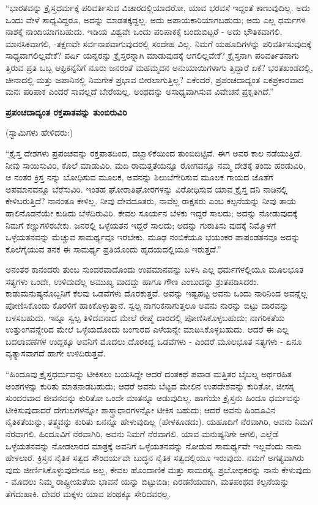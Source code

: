 “ಭಾರತವನ್ನು ಕ್ರೈಸ್ತಧರ್ಮಕ್ಕೆ ಪರಿವರ್ತಿಸುವ ವಿಚಾರದಲ್ಲಿಯಾದರೋ, ಯಾವ ಭರವಸೆ ಇದ್ದಂತೆ ಕಾಣುವುದಿಲ್ಲ. ಅದು ಒಂದು ವೇಳೆ ಸಾಧ್ಯವಿದ್ದರೂ, ಅದನ್ನು ಮಾಡತಕ್ಕದ್ದಲ್ಲ. ಅದು ಅಪಾಯಕಾರಿಯಾಗಬಹುದು; ಅದು ಎಲ್ಲ ಧರ್ಮಗಳ ನಾಶಕ್ಕೆ ನಾಂದಿಯಾಗಬಹುದು. ಇಡಿಯ ವಿಶ್ವವೇ ಒಂದು ಪರಿಪಾಕಕ್ಕೆ ಬಂದುಬಿಟ್ಟರೆ - ಅದು ಭೌತಿಕವಾಗಲಿ, ಮಾನಸಿಕವಾಗಲಿ, -ತಕ್ಷಣವೇ ಸರ್ವನಾಶವಾಗುವುದರಲ್ಲಿ ಸಂದೇಹ ವಿಲ್ಲ. ನಿಮಗೆ ಯಹೂದಿಗಳನ್ನು ಪರಿವರ್ತಿಸುವುದಕ್ಕೆ ಸಾಧ್ಯವಾಗಲಿಲ್ಲವೇಕೆ? ಪರ್ಷಿ ಯನ್ನರನ್ನು ಕ್ರೈಸ್ತರನ್ನಾಗಿ ಮಾಡುವುದಕ್ಕೆ ಆಗಲಿಲ್ಲವೇಕೆ? ಕ್ರೈಸ್ತನಾಗಿ ಪರಿವರ್ತಿತನಾಗು ತ್ತಿರುವ ಪ್ರತಿ ಒಬ್ಬ ಆಫ್ರಿಕನ್ನನಿಗೆ ನೂರು ಜನರಂತೆ ಮಹಮ್ಮದನ ಅನುಯಾಯಿಗಳಾಗು ತ್ತಿದ್ದಾರೆ ಏಕೆ? ಭರತಖಂಡದಲ್ಲಿ, ಚೀನಾದಲ್ಲಿ ಮತ್ತು ಜಪಾನಿನಲ್ಲಿ ನಿಮಗೇಕೆ ಪ್ರಭಾವ ಬೀರಲಾಗುತ್ತಿಲ್ಲ? ಏಕೆಂದರೆ, ಪ್ರಪಂಚದಾದ್ಯಂತ ಏಕಪ್ರಕಾರವಾದ ಮನಃ ಪರಿಪಾಕ ಎಂದರೆ ಸಾವಲ್ಲದೆ ಬೇರೆಯಲ್ಲ. ಅಂಥದನ್ನು ಅಸಾಧ್ಯವಾಗಿಸುವ ವಿವೇಚನೆ ಪ್ರಕೃತಿಗಿದೆ.”

\begin{center}
\textbf{ಪ್ರಪಂಚದಾದ್ಯಂತ ರಕ್ತಪಾತವನ್ನು ತುಂಬಿರುವಿರಿ}
\end{center}

(ಸ್ವಾಮಿಗಳು ಹೇಳಿದರು:)

“ಕ್ರೈಸ್ತ ದೇಶಗಳು ಪ್ರಪಂಚವನ್ನು ರಕ್ತಪಾತದಿಂದ, ದಬ್ಬಾಳಿಕೆಯಿಂದ ತುಂಬಿಬಿಟ್ಟಿವೆ. ಈಗ ಅವರ ಕಾಲ ನಡೆಯುತ್ತಿದೆ. ನೀವು ಸಾಯಿಸುವಿರಿ, ಕೊಲೆ ಮಾಡುವಿರಿ, ಮದಿ ರಾಮತ್ತತೆಯನ್ನೂ ರೋಗವನ್ನೂ ನಮ್ಮ ದೇಶಕ್ಕೆ ತಂದು ಹರಡುವಿರಿ, ಆ ನಂತರ ಕ್ರಿಸ್ತ ನನ್ನು ಬೋಧಿಸುವ ಮೂಲಕ, ಅವನನ್ನು ಶಿಲುಬೆಗೇರಿಸುವ ಮೂಲಕ ಗಾಯದ ಜೊತೆಗೆ ಅಪಮಾನವನ್ನೂ ಬೆರೆಸುವಿರಿ. ಇಂತಹ ಘೋರಾತಿಘೋರಗಳನ್ನು ವಿರೋಧಿಸುವ ಯಾವ ಕ್ರೈಸ್ತ ದನಿ ನಾಡಿನಲ್ಲಿ ಕೇಳಿಬರುತ್ತಿದೆ? ನಾನಂತೂ ಕೇಳಿಲ್ಲ. ನೀವು ದೇವದೂತರು, ನಾವೆಲ್ಲ ರಾಕ್ಷಸರು ಎಂಬ ಕಲ್ಪನೆಯನ್ನು ನೀವು ತಾಯ ಹಾಲಿನೊಡನೆಯೇ ಕುಡಿದು ಬೆಳೆದಿರುವಿರಿ. ಕೇವಲ ಸೂರ್ಯನ ಬೆಳಕು ಇದ್ದರೆ ಸಾಲದು; ಅದನ್ನು ನೋಡುವುದಕ್ಕೆ ನಿಮಗೆ ಕಣ್ಣುಗಳಿರಬೇಕು. ಜನರಲ್ಲಿ ಒಳ್ಳೆಯತನ ಇದ್ದರೆ ಸಾಲದು; ಅದನ್ನು ಗುರುತಿಸು ವುದಕ್ಕೆ ನಿಮ್ಮೊಳಗೆ ಒಳ್ಳೆಯತನವನ್ನು ಮೆಚ್ಚುವ ಸಾಮರ್ಥ್ಯವೂ ಇರಬೇಕು. ಮೂಢ ನಂಬಿಕೆಯೂ ಭಯಂಕರ ಪಾಷಂಡತನವೂ ಅದನ್ನು ಕೊಲೆಗೈಯುವ ತನಕ ಈ ಸಾಮರ್ಥ್ಯ ಪ್ರತಿಯೊಂದು ಹೃದಯದಲ್ಲಿಯೂ ಇರುತ್ತದೆ.”

ಅನಂತರ ಕಾನಂದರು ತುಂಬ ಸುಂದರವಾದೊಂದು ಉಪಮಾನವನ್ನು ಬಳಸಿ ಎಲ್ಲ ಧರ್ಮಗಳಲ್ಲಿಯೂ ಮೂಲಭೂತ ಸತ್ಯಗಳು ಒಂದೇ, ಉಳಿದುದೆಲ್ಲ ಅಮುಖ್ಯ ವಾದದ್ದು ಹಾಗೂ ಗೌಣ ಎಂಬುದನ್ನು ಶ್ರುತಪಡಿಸಿದರು. ಕಾಡುಮನುಷ್ಯನೊಬ್ಬನಿಗೆ ಕೆಲವು ಒಡವೆಗಳು ದೊರಕುತ್ತವೆ. ಅವನ್ನು ಇಷ್ಟಪಟ್ಟ ಅವನು ಒಂದು ನಾರಿನಿಂದ ಅವನ್ನೆಲ್ಲ ಪೋಣಿಸಿಕೊಂಡು ಕೊರಳಿಗೆ ಹಾಕಿಕೊಳ್ಳುತ್ತಾನೆ. ಸ್ವಲ್ಪ ನಾಗರಿಕನಾಗುತ್ತಲೂ ಅವನು ನಾರನ್ನು ಬಿಟ್ಟು ದಾರವನ್ನು ಬಳಸಬಹುದು. ಇನ್ನೂ ಸ್ವಲ್ಪ ತಿಳಿದವನಾದ ಮೇಲೆ ರೇಷ್ಮೆ ದಾರದಲ್ಲಿ ಪೋಣಿಸಿಕೊಳ್ಳಬಹುದು; ನಾಗರಿಕತೆಯ ಉತ್ತುಂಗವನ್ನೇರಿದ ಮೇಲೆ ಒಳ್ಳೆಯದೊಂದು ಬಂಗಾರದ ಎಳೆಯನ್ನೇ ಮಾಡಿಸಿಕೊಳ್ಳಬಹುದು. ಆದರೆ ಈ ಎಲ್ಲ ಬದಲಾವಣೆಗಳ ಉದ್ದಕ್ಕೂ ಅವನಿಗೆ ಮೊದಲು ದೊರಕಿದ್ದ ಒಡವೆಗಳು - ಎಂದರೆ ಮೂಲಭೂತ ಸತ್ಯಗಳು - ಏನೂ ವ್ಯತ್ಯಾಸವಾಗದೆ ಹಾಗೇ ಉಳಿದಿರುತ್ತವೆ.

“ಹಿಂದೂವು ಕ್ರೈಸ್ತಧರ್ಮವನ್ನು ಟೀಕಿಸಲು ಬಯಸಿದ್ದೇ ಆದರೆ ದಂತಕಥೆ ಪವಾಡ ಮತ್ತಿತರ ಬೈಬಲ್ನ ಅರ್ಥರಹಿತ ಅಂಶಗಳನ್ನು ಕುರಿತು ಮಾತನಾಡಬಹುದು; ಆದರೆ ಅವನು ಬೆಟ್ಟದ ಮೇಲಿನ ಉಪದೇಶವನ್ನು ಕುರಿತೋ, ಜೀಸಸ್ನ ಸುಂದರವಾದ ಜೀವನವನ್ನು ಕುರಿತೋ ಒಂದೇ ಮಾತನ್ನೂ ಆಡುವುದಿಲ್ಲ. ಹಾಗೆಯೇ ಕ್ರೈಸ್ತನು ಹಿಂದೂ ಧರ್ಮವನ್ನು ಟೀಕಿಸುವುದಾದರೆ ದೇಗುಲಗಳನ್ನೋ ಶಾಸ್ತ್ರಾಧಾರಗಳನ್ನೋ ಟೀಕಿಸ ಬಹುದು; ಆದರೆ ಅವನು ಹಿಂದೂವಿನ ನೈತಿಕತೆಯನ್ನು, ತತ್ತ್ವವನ್ನು ಕುರಿತು ಏನನ್ನೂ ಹೇಳುವುದಿಲ್ಲ (ಹೇಳಕೂಡದು). ಯಹೂದಿಗೆ ನೆರವಾಗಿರಿ, ಅವನು ನಿಮಗೆ ನೆರವಾಗಲಿ. ಹಿಂದೂವಿಗೆ ನೆರವಾಗಿರಿ, ಅವನು ನಿಮಗೆ ನೆರವಾಗಲಿ. ಯಾವ ಮನುಷ್ಯನಿಗೇ ಆಗಲಿ, ಎಲ್ಲೆಡೆ ಒಳ್ಳೆಯತನವನ್ನು ನೋಡಲಾರದ ಮಾತ್ರಕ್ಕೆ ಅವನಿಗೆ ಒಳ್ಳೆಯತನವನ್ನು ನೋಡುವ ಸಾಮರ್ಥ್ಯವೇ ಇಲ್ಲವೆಂದು ನಾನು ಹೇಳಲಾರೆ. ಕ್ರಿಸ್ತನ ನೈತಿಕ ಸತ್ವದ ಸೌಂದರ್ಯವೇ ಬುದ್ಧನ ನೈತಿಕ ಸತ್ವದಲ್ಲಿಯೂ ಇರುವುದು. ನಮಗೆ ಅಗತ್ಯವಾಗಿರು ವುದು ಜೀರ್ಣಿಸಿಕೊಳ್ಳುವುದೇನೂ ಅಲ್ಲ, ಕೇವಲ ಹೊಂದಾಣಿಕೆ ಮತ್ತು ಸಾಮರಸ್ಯ. ಪ್ರಬೋಧಕರನ್ನು ನಾನು ಕೇಳುವುದು - ಮೊದಲು ನಿಮ್ಮ ರಾಷ್ಟ್ರೀಯತೆಯ ಭಾವನೆ ಯನ್ನು ಬಿಟ್ಟುಬಿಡಿ; ಎರಡನೆಯದಾಗಿ, ಮತಪಂಥದ ಕಲ್ಪನೆಯನ್ನು ತೆಗೆದುಹಾಕಿ. ದೇವರ ಮಕ್ಕಳು ಯಾವ ಪಂಥಕ್ಕೂ ಸೇರಿದವರಲ್ಲ.

